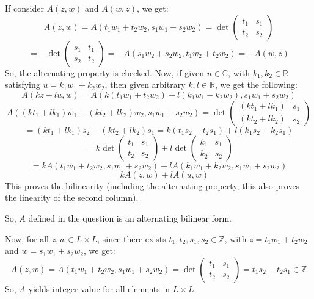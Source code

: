 \documentclass{article}
\begin{document}
\begin{itemize}
    If consider $A(z,w)$ and $A(w,z)$, we get:
    $$A(z,w)=A(t_1w_1+t_2w_2,s_1w_1+s_2w_2) = \det\begin{pmatrix}t_1&s_1\\t_2&s_2\end{pmatrix}$$ 
    $$=-\det\begin{pmatrix}s_1&t_1\\s_2&t_2\end{pmatrix} = -A(s_1w_2+s_2w_2,t_1w_2+t_2w_2) = -A(w,z)$$
    So, the alternating property is checked. Now, if given $u\in\mathbb{C}$, with $k_1,k_2\in\mathbb{R}$ satisfying $u=k_1w_1+k_2w_2$, then given arbitrary $k,l\in\mathbb{R}$, we get the following:
    $$A(kz+lu,w)=A(k(t_1w_1+t_2w_2)+l(k_1w_1+k_2w_2),s_1w_1+s_2w_2)$$
    $$A((kt_1+lk_1)w_1+(kt_2+lk_2)w_2,s_1w_1+s_2w_2) = \det\begin{pmatrix}
        (kt_1+lk_1) & s_1\\
        (kt_2+lk_2) & s_2
    \end{pmatrix}$$
    $$ = (kt_1+lk_1)s_2 - (kt_2+lk_2)s_1 = k(t_1s_2-t_2s_1)+l(k_1s_2-k_2s_1)$$
    $$=k\det\begin{pmatrix}t_1&s_1\\t_2&s_2\end{pmatrix} + l\det\begin{pmatrix}k_1&s_1\\k_2&s_2\end{pmatrix}$$
    $$ = kA(t_1w_1+t_2w_2,s_1w_1+s_2w_2)+ lA(k_1w_1+k_2w_2,s_1w_1+s_2w_2)$$
    $$= kA(z,w)+lA(u,w)$$
    This proves the bilinearity (including the alternating property, this also proves the linearity of the second column).

    So, $A$ defined in the question is an alternating bilinear form.

    \hfil

    Now, for all $z,w\in L\times L$, since there exists $t_1,t_2,s_1,s_2\in\mathbb{Z}$, with $z=t_1w_1+t_2w_2$ and $w=s_1w_1+s_2w_2$, we get:
    $$A(z,w)=A(t_1w_1+t_2w_2,s_1w_1+s_2w_2)=\det\begin{pmatrix}t_1&s_1\\t_2&s_2\end{pmatrix} = t_1s_2-t_2s_1 \in\mathbb{Z}$$
    So, $A$ yields integer value for all elements in $L\times L$.

    \hfil


\end{itemize}
\end{document}
